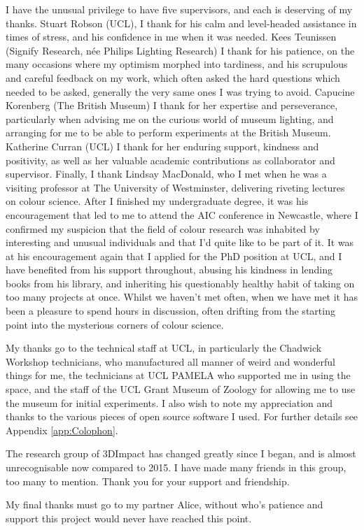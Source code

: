 \begin{acknowledgements}
I have the unusual privilege to have five supervisors, and each is deserving of my thanks. Stuart Robson (\gls{UCL}), I thank for his calm and level-headed assistance in times of stress, and his confidence in me when it was needed. Kees Teunissen (Signify Research, née Philips Lighting Research) I thank for his patience, on the many occasions where my optimism morphed into tardiness, and his scrupulous and careful feedback on my work, which often asked the hard questions which needed to be asked, generally the very same ones I was trying to avoid. Capucine Korenberg (The British Museum) I thank for her expertise and perseverance, particularly when advising me on the curious world of museum lighting, and arranging for me to be able to perform experiments at the British Museum. Katherine Curran (\gls{UCL}) I thank for her enduring support, kindness and positivity, as well as her valuable academic contributions as collaborator and supervisor. Finally, I thank Lindsay MacDonald, who I met when he was a visiting professor at The University of Westminster, delivering riveting lectures on colour science. After I finished my undergraduate degree, it was his encouragement that led to me to attend the AIC conference in Newcastle, where I confirmed my suspicion that the field of colour research was inhabited by interesting and unusual individuals and that I'd quite like to be part of it. It was at his encouragement again that I applied for the PhD position at \gls{UCL}, and I have benefited from his support throughout, abusing his kindness in lending books from his library, and inheriting his questionably healthy habit of taking on too many projects at once. Whilst we haven't met often, when we have met it has been a pleasure to spend hours in discussion, often drifting from the starting point into the mysterious corners of colour science.

My thanks go to the technical staff at \gls{UCL}, in particularly the Chadwick Workshop technicians, who manufactured all manner of weird and wonderful things for me, the technicians at \gls{UCL} \gls{PAMELA} who supported me in using the space, and the staff of the \gls{UCL} Grant Museum of Zoology for allowing me to use the museum for initial experiments. I also wish to note my appreciation and thanks to the various pieces of open source software I used. For further details see Appendix \ref{app:Colophon}.

The research group of 3DImpact has changed greatly since I began, and is almost unrecognisable now compared to 2015. I have made many friends in this group, too many to mention. Thank you for your support and friendship.

My final thanks must go to my partner Alice, without who's patience and support this project would never have reached this point.

\end{acknowledgements}